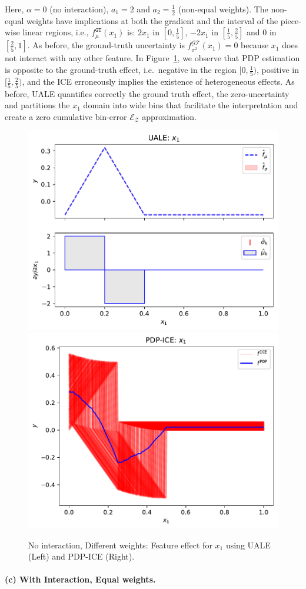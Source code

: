 \documentclass[twoside]{article}
\begin{document}
Here, \(\alpha=0\) (no interaction), \(a_1 = 2\) and
\(a_2= \frac{1}{2}\) (non-equal weights). The non-equal weights have
implications at both the gradient and the interval of the piece-wise
linear regions, i.e., \(f_\mu^{\mathtt{GT}}(x_1)\) is: \(2x_1\) in
\([0, \frac{1}{5}]\), \(-2x_1\) in \([\frac{1}{5}, \frac{2}{5}]\) and
\(0\) in \([\frac{2}{5}, 1]\). As before, the ground-truth uncertainty
is \(f^{\mathcal{GT}}_{\sigma^2}(x_1) = 0\) because \(x_1\) does not
interact with any other feature. In Figure~\ref{fig:ex-synth-1-2}, we
observe that PDP estimation is opposite to the ground-truth effect,
i.e.~negative in the region \([0, \frac{1}{5})\), positive in
\([\frac{1}{5}, \frac{2}{5})\), and the ICE erroneously implies the
existence of heterogeneous effects. As before, UALE quantifies
correctly the ground truth effect, the zero-uncertainty and partitions
the \(x_1\) domain into wide bins that facilitate the interpretation
and create a zero cumulative bin-error \(\mathcal{E}_{\mathcal{Z}}\)
approximation.

\begin{figure}[h]
  \centering
  \includegraphics[width=.23\textwidth]{example_2/dale_feat_0.pdf}
  \includegraphics[width=.23\textwidth]{example_2/pdp_ice_feat_0.pdf}
  \caption{No interaction, Different weights: Feature effect for \(x_1\)
    using UALE (Left) and PDP-ICE (Right).}
  \label{fig:ex-synth-1-2}
\end{figure}

\paragraph{(c) With Interaction, Equal weights.}
\end{document}
